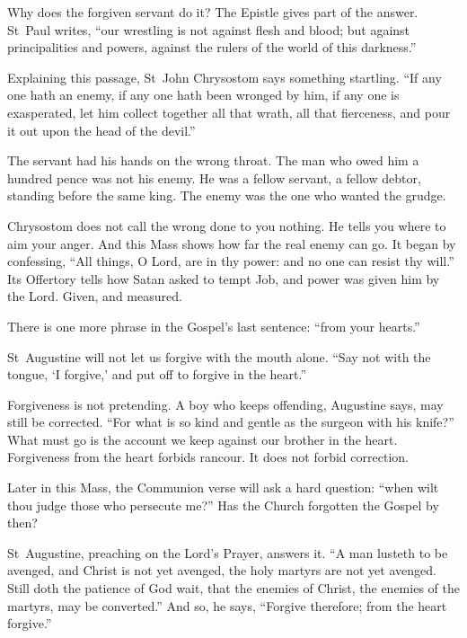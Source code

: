 \medskip

Why does the forgiven servant do it? The Epistle gives part of the answer.
St~Paul writes, ``our wrestling is not against flesh and blood; but against
principalities and powers, against the rulers of the world of this darkness.''

Explaining this passage, St~John Chrysostom says something startling. ``If any
one hath an enemy, if any one hath been wronged by him, if any one is
exasperated, let him collect together all that wrath, all that fierceness, and
pour it out upon the head of the devil.''

The servant had his hands on the wrong throat. The man who owed him a hundred
pence was not his enemy. He was a fellow servant, a fellow debtor, standing
before the same king. The enemy was the one who wanted the grudge.

Chrysostom does not call the wrong done to you nothing. He tells you where to
aim your anger. And this Mass
shows how far the real enemy can go. It began by confessing, ``All things,
O Lord, are in thy power: and no one can resist thy will.'' Its Offertory tells
how Satan asked to tempt Job, and power was given him by the Lord. Given, and
measured.

\medskip

There is one more phrase in the Gospel's last sentence: ``from your hearts.''

St~Augustine will not let us forgive with the mouth alone. ``Say not with the
tongue, `I forgive,' and put off to forgive in the heart.''

Forgiveness is not pretending. A boy who keeps offending, Augustine says, may
still be corrected. ``For what is so kind and gentle as the surgeon with his
knife?'' What must go is the account we keep against our brother in the heart.
Forgiveness from the heart forbids rancour. It does not forbid correction.

\medskip

Later in this Mass, the Communion verse will ask a hard question: ``when wilt
thou judge those who persecute me?'' Has the Church forgotten the Gospel by
then?

St~Augustine, preaching on the Lord's Prayer, answers it. ``A man lusteth to
be avenged, and Christ is not yet avenged, the holy martyrs are not yet
avenged. Still doth the patience of God wait, that the enemies of Christ, the
enemies of the martyrs, may be converted.'' And so, he says, ``Forgive
therefore; from the heart forgive.''

